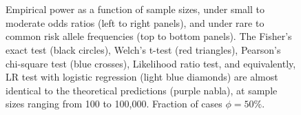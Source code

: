 \begin{figure}[!tpb]
{        }\\ %
        \\ %
\caption{Empirical power as a function of sample sizes, under small to moderate odds ratios (left to right panels), and under rare to common risk allele frequencies (top to bottom panels).
The Fisher's exact test (black circles), Welch's t-test (red triangles), Pearson's chi-square test (blue crosses), Likelihood ratio test, and equivalently, LR test with logistic regression (light blue diamonds) are almost identical to the theoretical predictions (purple nabla), at sample sizes ranging from 100 to 100,000. Fraction of cases $\phi = 50\%$.
}\label{fig:compare-phi050}
\end{figure}


